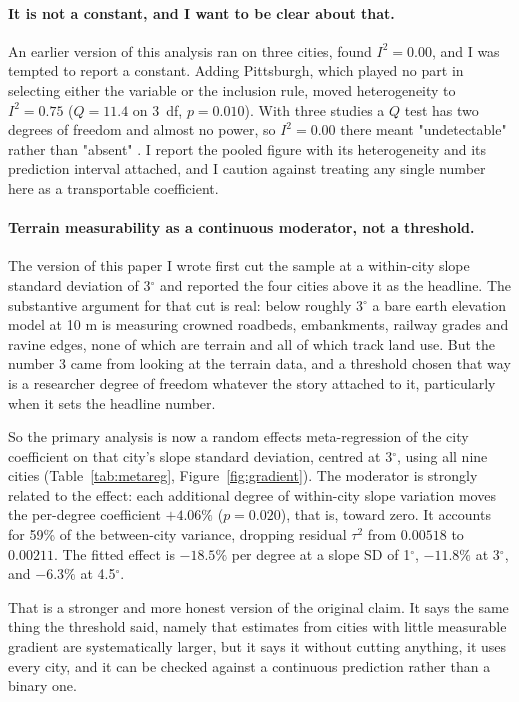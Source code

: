 \documentclass[12pt,letterpaper]{article}
\begin{document}
\paragraph{It is not a constant, and I want to be clear about that.} An earlier
version of this analysis ran on three cities, found $I^2 = 0.00$, and I was tempted to
report a constant. Adding Pittsburgh, which played no part in selecting either the
variable or the inclusion rule, moved heterogeneity to $I^2 = 0.75$ ($Q = 11.4$ on
3~df, $p = 0.010$). With three studies a $Q$ test has two degrees of freedom and
almost no power, so $I^2 = 0.00$ there meant "undetectable" rather than "absent"
\citep{higgins2002}. I report the pooled figure with its heterogeneity and its
prediction interval attached, and I caution against treating any single number here
as a transportable coefficient.

\paragraph{Terrain measurability as a continuous moderator, not a threshold.} The
version of this paper I wrote first cut the sample at a within-city slope standard
deviation of 3$^\circ$ and reported the four cities above it as the headline. The
substantive argument for that cut is real: below roughly 3$^\circ$ a bare earth
elevation model at 10 m is measuring crowned roadbeds, embankments, railway grades
and ravine edges, none of which are terrain and all of which track land use. But the
number 3 came from looking at the terrain data, and a threshold chosen that way is a
researcher degree of freedom whatever the story attached to it, particularly when it
sets the headline number.

So the primary analysis is now a random effects meta-regression of the city
coefficient on that city's slope standard deviation, centred at 3$^\circ$, using all
nine cities (Table~\ref{tab:metareg}, Figure~\ref{fig:gradient}). The moderator is
strongly related to the effect: each additional degree of within-city slope
variation moves the per-degree coefficient $+4.06\%$ ($p = 0.020$), that is, toward
zero. It accounts for 59\% of the between-city variance, dropping residual $\tau^2$
from $0.00518$ to $0.00211$. The fitted effect is $-18.5\%$ per degree at a slope SD
of 1$^\circ$, $-11.8\%$ at 3$^\circ$, and $-6.3\%$ at 4.5$^\circ$.

That is a stronger and more honest version of the original claim. It says the same
thing the threshold said, namely that estimates from cities with little measurable
gradient are systematically larger, but it says it without cutting anything, it uses
every city, and it can be checked against a continuous prediction rather than a
binary one.
\end{document}
